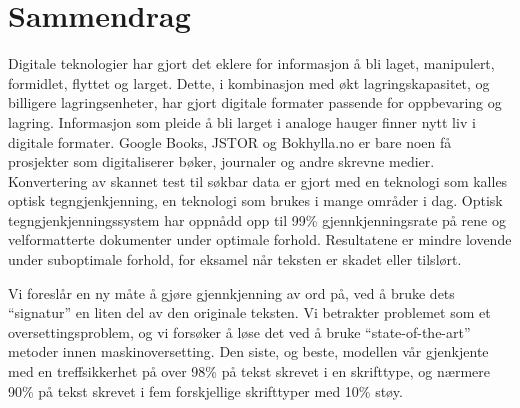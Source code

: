 
\chapter*{Sammendrag}
Digitale teknologier har gjort det eklere for informasjon å bli laget, manipulert, formidlet, flyttet og larget. Dette, i kombinasjon med økt lagringskapasitet, og billigere lagringsenheter, har gjort digitale formater passende for oppbevaring og lagring. Informasjon som pleide å bli larget i analoge hauger finner nytt liv i digitale formater. Google Books, JSTOR og Bokhylla.no er bare noen få prosjekter som digitaliserer bøker, journaler og andre skrevne medier. Konvertering av skannet test til søkbar data er gjort med en teknologi som kalles optisk tegngjenkjenning, en teknologi som brukes i mange områder i dag. Optisk tegngjenkjenningssystem har oppnådd opp til 99\% gjennkjenningsrate på rene og velformatterte dokumenter under optimale forhold. Resultatene er mindre lovende under suboptimale forhold, for eksamel når teksten er skadet eller tilslørt. \newline

\noindent Vi foreslår en ny måte å gjøre gjennkjenning av ord på, ved å bruke dets ``signatur'' en liten del av den originale teksten. Vi betrakter problemet som et oversettingsproblem, og vi forsøker å løse det ved å bruke ``state-of-the-art'' metoder innen maskinoversetting. Den siste, og beste, modellen vår gjenkjente med en treffsikkerhet på over 98\% på tekst skrevet i en skrifttype, og nærmere 90\% på tekst skrevet i fem forskjellige skrifttyper med 10\% støy.